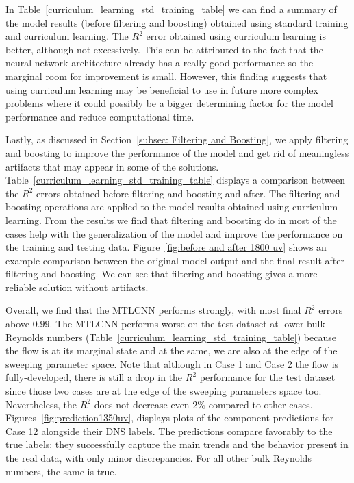 \documentclass[11pt]{article}
\numberwithin{equation}{section}
\theoremstyle{plain}
\theoremstyle{definition}
\begin{document}
In Table~\ref{curriculum_learning_std_training_table} we can find a summary of the model results (before filtering and boosting) obtained using standard training and curriculum learning. The $R^{2}$ error obtained using curriculum learning is better, although not excessively. This can be attributed to the fact that the neural network architecture already has a really good performance so the marginal room for improvement is small. However, this finding suggests that using curriculum learning may be beneficial to use in future more complex problems where it could possibly be a bigger determining factor for the model performance and reduce computational time.



Lastly, as discussed in Section~\ref{subsec: Filtering and Boosting}, we apply filtering and boosting to improve the performance of the model and get rid of meaningless artifacts that may appear in some of the solutions. Table~\ref{curriculum_learning_std_training_table} displays a comparison between the $R^{2}$ errors obtained before filtering and boosting and after. The filtering and boosting operations are applied to the model results obtained using curriculum learning. From the results we find that filtering and boosting do in most of the cases help with the generalization of the model and improve the performance on the training and testing data. Figure~\ref{fig:before and after 1800 uv} shows an example comparison between the original model output and the final result after filtering and boosting. We can see that filtering and boosting gives a more reliable solution without artifacts. 



Overall, we find that the MTLCNN performs strongly, with most final $R^{2}$ errors above $0.99$. The MTLCNN performs worse on the test dataset at lower bulk Reynolds numbers (Table~\ref{curriculum_learning_std_training_table}) because the flow is at its marginal state and at the same, we are also at the edge of the sweeping parameter space. Note that although in Case 1 and Case 2 the flow is fully-developed, there is still a drop in the $R^{2}$ performance for the test dataset since those two cases are at the edge of the sweeping parameters space too. Nevertheless, the $R^{2}$ does not decrease even $2\%$ compared to other cases. Figures~\ref{fig:prediction1350uv}, displays plots of the component predictions for Case 12 alongside their DNS labels. The predictions compare favorably to the true labels: they successfully capture the main trends and the behavior present in the real data, with only minor discrepancies. For all other bulk Reynolds numbers, the same is true.
\end{document}
